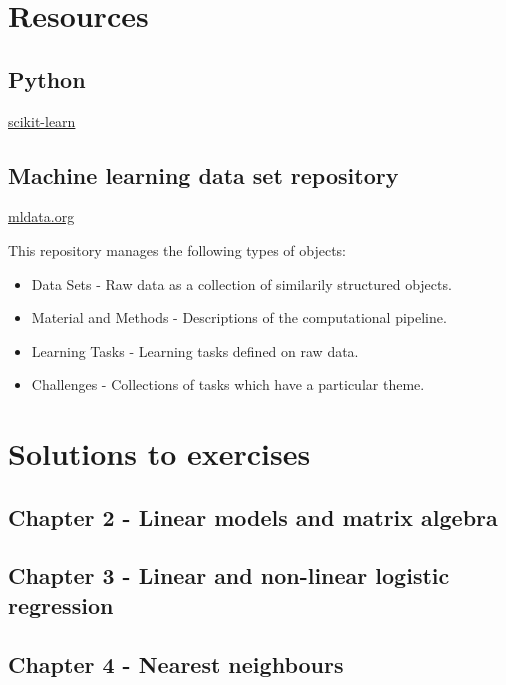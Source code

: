 \documentclass[]{book}
\providecommand{\tightlist}{%
  \setlength{\itemsep}{0pt}\setlength{\parskip}{0pt}}
\theoremstyle{definition}
\theoremstyle{definition}
\theoremstyle{remark}
\begin{document}
\appendix


\chapter{Resources}\label{resources}

\section{Python}\label{python}

\href{http://scikit-learn.org}{scikit-learn}

\section{Machine learning data set
repository}\label{machine-learning-data-set-repository}

\href{http://mldata.org/}{mldata.org}

This repository manages the following types of objects:

\begin{itemize}
\tightlist
\item
  Data Sets - Raw data as a collection of similarily structured objects.
\item
  Material and Methods - Descriptions of the computational pipeline.
\item
  Learning Tasks - Learning tasks defined on raw data.
\item
  Challenges - Collections of tasks which have a particular theme.
\end{itemize}

\chapter{Solutions to exercises}\label{solutions-to-exercises}

\section{Chapter 2 - Linear models and matrix
algebra}\label{solutions-linear-models}

\section{Chapter 3 - Linear and non-linear logistic
regression}\label{solutions-logistic-regression}

\section{Chapter 4 - Nearest
neighbours}\label{solutions-nearest-neighbours}
\end{document}
